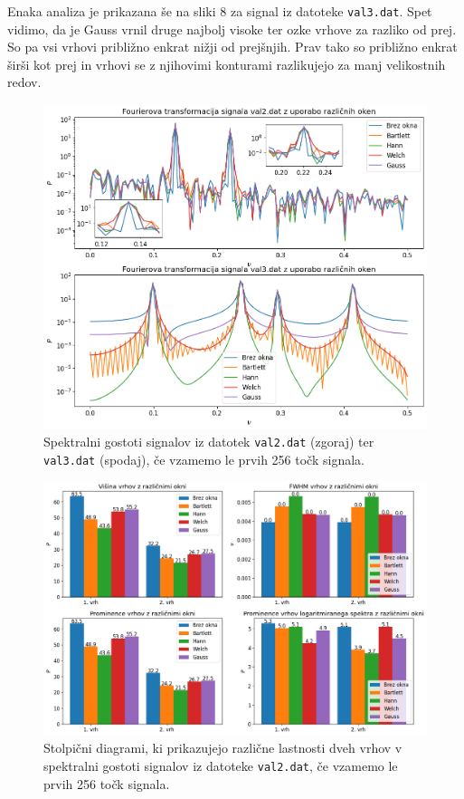 \documentclass[slovene,11pt,a4paper]{article}
\begin{document}
Enaka analiza je prikazana še na sliki 8 za signal iz datoteke \texttt{val3.dat}. Spet vidimo, da je Gauss vrnil druge najbolj visoke ter ozke vrhove za razliko od prej. So pa vsi vrhovi približno enkrat nižji od prejšnjih. Prav tako so približno enkrat širši kot prej in vrhovi se z njihovimi konturami razlikujejo za manj velikostnih redov.

\begin{figure}[h!]
\centering
\includegraphics[width=12cm]{slika6.png}
\caption{Spektralni gostoti signalov iz datotek \texttt{val2.dat} (zgoraj) ter \texttt{val3.dat} (spodaj), če vzamemo le prvih 256 točk signala.}
\end{figure}

\begin{figure}[h!]
\centering
\includegraphics[width=15cm]{slika7.png}
\caption{Stolpični diagrami, ki prikazujejo različne lastnosti dveh vrhov v spektralni gostoti signalov iz datoteke \texttt{val2.dat}, če vzamemo le prvih 256 točk signala.}
\end{figure}
\end{document}
